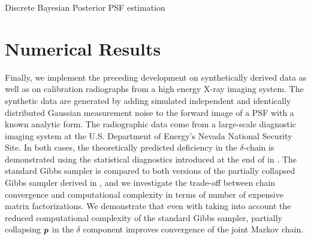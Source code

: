 \begin{chapter}{Discrete Bayesian Posterior PSF estimation}
\section{Numerical Results} \label{chapter:results}
Finally, we implement the preceding development on synthetically derived data as well as on calibration radiographs from a high energy X-ray imaging system.
The synthetic data are generated by adding simulated independent and identically distributed Gaussian measurement noise to the forward image of a PSF with a known analytic form.
The radiographic data come from a large-scale diagnostic imaging system at the U.S. Department of Energy's Nevada National Security Site.
In both cases, the theoretically predicted deficiency in the $\delta$-chain is demonstrated using the statistical diagnostics introduced at the end of  in .
The standard Gibbs sampler is compared to both versions of the partially collapsed Gibbs sampler derived in , and we investigate the trade-off between chain convergence and computational complexity in terms of number of expensive matrix factorizations.
We demonstrate that even with taking into account the reduced computational complexity of the standard Gibbs sampler, partially collapsing $\mbox{\boldmath$p$}$ in the $\delta$ component improves convergence of the joint Markov chain.


\end{chapter}
